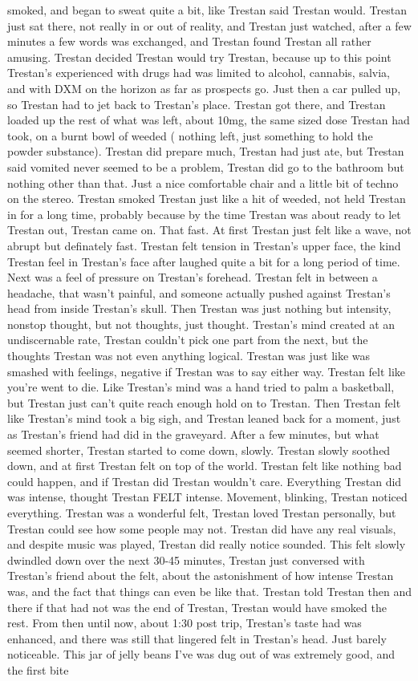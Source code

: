 \documentclass[12pt]{book}
\begin{document}
smoked, and began to sweat quite a bit, like Trestan said Trestan would. Trestan just sat there, not really in or out of reality, and Trestan just watched, after a few minutes a few words was exchanged, and Trestan found Trestan all rather amusing. Trestan decided Trestan would try Trestan, because up to this point Trestan's experienced with drugs had was limited to alcohol, cannabis, salvia, and with DXM on the horizon as far as prospects go. Just then a car pulled up, so Trestan had to jet back to Trestan's place. Trestan got there, and Trestan loaded up the rest of what was left, about 10mg, the same sized dose Trestan had took, on a burnt bowl of weeded ( nothing left, just something to hold the powder substance). Trestan did prepare much, Trestan had just ate, but Trestan said vomited never seemed to be a problem, Trestan did go to the bathroom but nothing other than that. Just a nice comfortable chair and a little bit of techno on the stereo. Trestan smoked Trestan just like a hit of weeded, not held Trestan in for a long time, probably because by the time Trestan was about ready to let Trestan out, Trestan came on. That fast. At first Trestan just felt like a wave, not abrupt but definately fast. Trestan felt tension in Trestan's upper face, the kind Trestan feel in Trestan's face after laughed quite a bit for a long period of time. Next was a feel of pressure on Trestan's forehead. Trestan felt in between a headache, that wasn't painful, and someone actually pushed against Trestan's head from inside Trestan's skull. Then Trestan was just nothing but intensity, nonstop thought, but not thoughts, just thought. Trestan's mind created at an undiscernable rate, Trestan couldn't pick one part from the next, but the thoughts Trestan was not even anything logical. Trestan was just like was smashed with feelings, negative if Trestan was to say either way. Trestan felt like you're went to die. Like Trestan's mind was a hand tried to palm a basketball, but Trestan just can't quite reach enough hold on to Trestan. Then Trestan felt like Trestan's mind took a big sigh, and Trestan leaned back for a moment, just as Trestan's friend had did in the graveyard. After a few minutes, but what seemed shorter, Trestan started to come down, slowly. Trestan slowly soothed down, and at first Trestan felt on top of the world. Trestan felt like nothing bad could happen, and if Trestan did Trestan wouldn't care. Everything Trestan did was intense, thought Trestan FELT intense. Movement, blinking, Trestan noticed everything. Trestan was a wonderful felt, Trestan loved Trestan personally, but Trestan could see how some people may not. Trestan did have any real visuals, and despite music was played, Trestan did really notice sounded. This felt slowly dwindled down over the next 30-45 minutes, Trestan just conversed with Trestan's friend about the felt, about the astonishment of how intense Trestan was, and the fact that things can even be like that. Trestan told Trestan then and there if that had not was the end of Trestan, Trestan would have smoked the rest. From then until now, about 1:30 post trip, Trestan's taste had was enhanced, and there was still that lingered felt in Trestan's head. Just barely noticeable. This jar of jelly beans I've was dug out of was extremely good, and the first bite 
\end{document}
